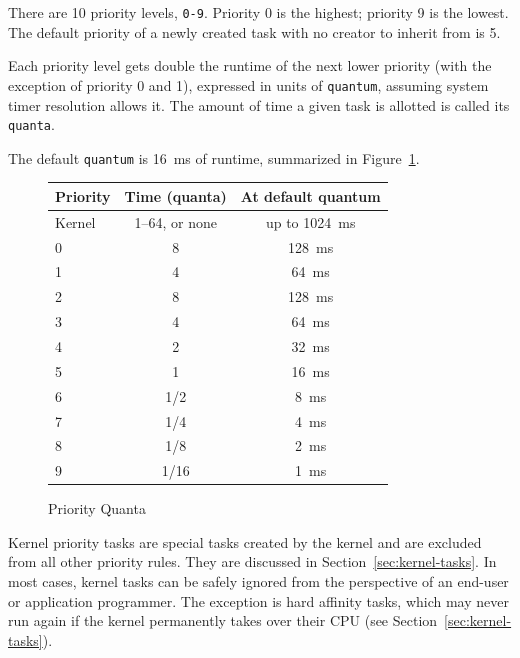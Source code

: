 \documentclass[11pt]{article}
\begin{document}
There are 10 priority levels, \texttt{0-9}. Priority 0 is the highest; priority 9 is the lowest. The default priority of a newly created task with no creator to inherit from is 5.

Each priority level gets double the runtime of the next lower priority (with the exception of priority 0 and 1), expressed in units of \texttt{quantum}, assuming system timer resolution allows it.
The amount of time a given task is allotted is called its \texttt{quanta}.

The default \texttt{quantum} is 16~ms of runtime, summarized in Figure~\ref{fig:priority-quanta}.

\begin{figure}[H]
	\centering
	\begin{tabular}{@{}lcc@{}}
		\toprule
		\textbf{Priority} & \textbf{Time (quanta)} & \textbf{At default quantum} \\
		\midrule
		Kernel            & 1--64, or none         & up to 1024~ms               \\
		0                 & 8                      & 128~ms                      \\
		1                 & 4                      & 64~ms                       \\
		2                 & 8                      & 128~ms                      \\
		3                 & 4                      & 64~ms                       \\
		4                 & 2                      & 32~ms                       \\
		5                 & 1                      & 16~ms                       \\
		6                 & 1/2                    & 8~ms                        \\
		7                 & 1/4                    & 4~ms                        \\
		8                 & 1/8                    & 2~ms                        \\
		9                 & 1/16                   & 1~ms                        \\
		\bottomrule
	\end{tabular}
	\caption{Priority Quanta}
	\label{fig:priority-quanta}
\end{figure}

Kernel priority tasks are special tasks created by the kernel and are excluded from all other priority rules.
They are discussed in Section~\ref{sec:kernel-tasks}.
In most cases, kernel tasks can be safely ignored from the perspective of an end-user or application programmer.
The exception is hard affinity tasks, which may never run again if the kernel permanently takes over their CPU (see Section~\ref{sec:kernel-tasks}).
\end{document}
